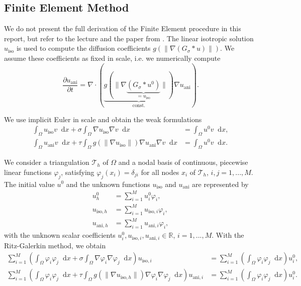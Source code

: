 \documentclass{report}
\renewcommand*\d{\mathop{}\!\mathrm{d}}
\renewcommand\phi{\varphi}
\def\R{\mathbb{R}}
\def\T{\mathcal{T}}
\def\iso{\text{iso}}
\def\ani{\text{ani}}
\begin{document}
\subsection{Finite Element Method} 

We do not present the full derivation of the Finite Element procedure in this report, but refer to the lecture and the paper from \cite{handlovicova2002}. The linear isotropic solution $u_\iso$ is used to compute the diffusion coefficients $g\left(\left\|\nabla (G_{\sigma} \ast u)\right\|\right)$. We assume these coefficients as fixed in scale, i.e. we numerically compute
\begin{equation}
	\frac{\partial u_\ani}{\partial t} = \nabla \cdot (\underbrace{g(\|\nabla \underbrace{(G_{\sigma} \ast u^0)}_{=u_\iso}\|)}_\text{const.} \nabla u_\ani).
\end{equation}

We use implicit Euler in scale and obtain the weak formulations
\begin{align}
	\int_\Omega u_\iso v \d x + \sigma \int_\Omega \nabla u_\iso \nabla v \d x &= \int_\Omega u^0 v \d x, \\
	\int_\Omega u_\ani v \d x + \tau \int_\Omega g(\|\nabla u_\iso\|) \nabla u_\ani \nabla v \d x &= \int_\Omega u^0 v \d x.
\end{align}

We consider a triangulation $\T_h$ of $\Omega$ and a nodal basis of continuous, piecewise linear functions $\phi_j$, satisfying $\phi_j(x_i) = \delta_{ji}$ for all nodes $x_i$ of $\T_h$, $i,j=1,...,M$. The initial value $u^0$ and the unknown functions $u_\iso$ and $u_\ani$ are represented by
\begin{align}
	u^0_h & = \sum_{i=1}^{M} u^0_i \phi_i, \\
	u_{\iso, h} &= \sum_{i=1}^{M} u_{\iso, i} \phi_i, \\
	u_{\ani, h} &= \sum_{i=1}^{M} u_{\ani, i} \phi_i,
\end{align}
with the unknown scalar coefficients $u^0_i, u_{\iso, i}, u_{\ani, i} \in \R$, $i=1,...,M$. With the Ritz-Galerkin method, we obtain
\begin{align}
	\sum_{i=1}^{M} \left( \int_\Omega \phi_i \phi_j \d x + \sigma \int_\Omega \nabla \phi_i \nabla \phi_j \d x \right) u_{\iso, i} &= \sum_{i=1}^{M} \left( \int_\Omega \phi_i \phi_j \d x \right) u^0_i, \\
	\sum_{i=1}^{M} \left( \int_\Omega \phi_i \phi_j \d x + \tau \int_\Omega g(\|\nabla u_{\iso,h}\|) \nabla \phi_i \nabla \phi_j \d x \right) u_{\ani, i} &= \sum_{i=1}^{M} \left( \int_\Omega \phi_i \phi_j \d x \right) u^0_i.
\end{align}
\end{document}
